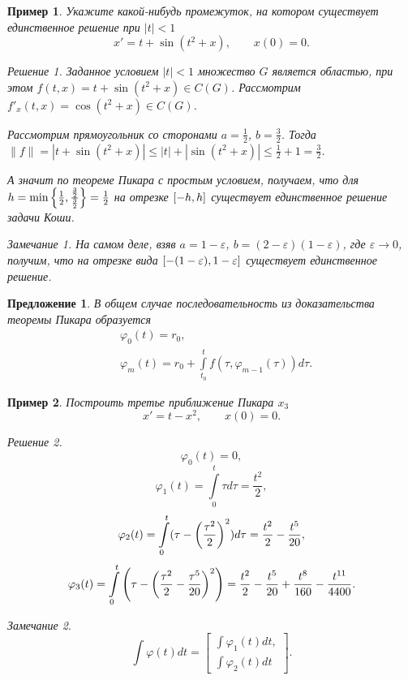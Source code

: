 \documentclass[a5paper, 11pt]{article}
\theoremstyle{definition}
\theoremstyle{plain}
\newtheorem*{Prop}{Предложение}
\newtheorem{Ex}{Пример}
\theoremstyle{remark}
\newtheorem*{Note}{Замечание}
\newtheorem*{Solution}{Решение}
\begin{document}
	\begin{Ex}
		Укажите какой-нибудь промежуток, на котором существует единственное решение при $|t|<1$
		\[
		x' = t+\sin(t^2+x), \qquad x(0)=0.
		\]
		\begin{Solution}
			Заданное условием $|t|<1$ множество $G$ является областью, при этом $f(t,x) =  t+\sin(t^2+x) \in C(G)$. Рассмотрим $f'_x(t,x) = \cos(t^2+x) \in C(G)$. 
			
			Рассмотрим прямоугольник со сторонами $a=\frac12$, $b=\frac32$. Тогда $\|f\| = |t+\sin(t^2+x)| \leqslant |t| + |\sin(t^2+x)| \leqslant \frac12 + 1 = \frac32$.
			
			А значит по теореме Пикара с простым условием, получаем, что для $h = \min \left\{\frac12, \frac{\frac32}{\frac32}\right\} = \frac12$ на отрезке $\left[-h, h\right]$ существует единственное решение задачи Коши.
			
			\begin{Note}
				На самом деле, взяв $a=1-\varepsilon$, $b=(2-\varepsilon)(1-\varepsilon)$, где $\varepsilon \to 0$, получим, что на отрезке вида $\left[-(1-\varepsilon), 1-\varepsilon\right]$ существует единственное решение. 
			\end{Note}
		\end{Solution}
	\end{Ex}
	\begin{Prop}
		В общем случае последовательность из доказательства теоремы Пикара образуется
		\[
		\begin{split}
		&\varphi_0(t) = r_0,\\
		&\varphi_m(t) = r_0 + \int\limits_{t_0}^t f(\tau, \varphi_{m-1}(\tau))d\tau.
		\end{split}
		\]
	\end{Prop}
	\begin{Ex}
		Построить третье приближение Пикара $x_3$
		\[
		x'=t-x^2, \qquad x(0)=0.
		\]
		\begin{Solution}
			\[
			\varphi_0(t) = 0,
			\]
			\[
			\varphi_1(t) = \int\limits_{0}^t \tau d\tau = \frac{t^2}{2}, 
			\]
			\[
			\varphi_2(t) = \int\limits_{0}^{t} (\tau - \left(\frac{\tau^2}{2}\right)^2) d\tau = \frac{t^2}{2} - \frac{t^5}{20},
			\]
			\[
			\varphi_3(t) = \int\limits_{0}^{t} \left(\tau - \left(\frac{\tau^2}{2} - \frac{\tau^5}{20}\right)^2\right) = \frac{t^2}{2} - \frac{t^5}{20} + \frac{t^8}{160} - \frac{t^{11}}{4400}.
			\]
		\end{Solution}
	\end{Ex}
	\begin{Note}
		\[
		\int\varphi(t)dt = \begin{bmatrix}
			\int\varphi_1(t) dt, \\
			\int\varphi_2(t) dt
		\end{bmatrix}.
		\]
	\end{Note}
\end{document}

